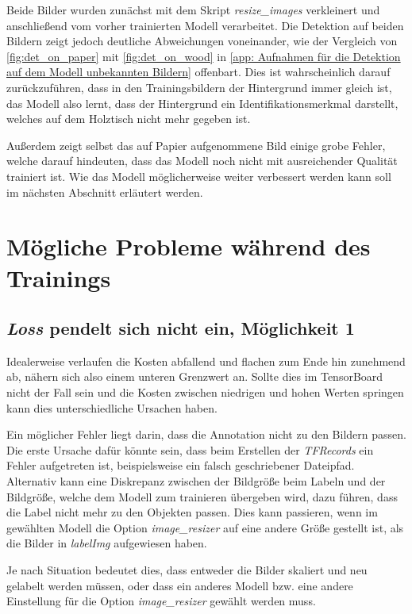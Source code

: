 \documentclass[12pt, oneside]{article}
\begin{document}
Beide Bilder wurden zunächst mit dem Skript \textit{resize\_images} verkleinert und anschließend vom vorher trainierten Modell verarbeitet. Die Detektion auf beiden Bildern zeigt jedoch deutliche Abweichungen voneinander, wie der Vergleich von \autoref{fig:det_on_paper} mit \autoref{fig:det_on_wood} in \autoref{app: Aufnahmen für die Detektion auf dem Modell unbekannten Bildern} offenbart. Dies ist wahrscheinlich darauf zurückzuführen, dass in den Trainingsbildern der Hintergrund immer gleich ist, das Modell also lernt, dass der Hintergrund ein Identifikationsmerkmal darstellt, welches auf dem Holztisch nicht mehr gegeben ist.

Außerdem zeigt selbst das auf Papier aufgenommene Bild einige grobe Fehler, welche darauf hindeuten, dass das Modell noch nicht mit ausreichender Qualität trainiert ist. Wie das Modell möglicherweise weiter verbessert werden kann soll im nächsten Abschnitt erläutert werden.

\section{Mögliche Probleme während des Trainings}

\subsection{\textit{Loss} pendelt sich nicht ein, Möglichkeit 1}

Idealerweise verlaufen die Kosten abfallend und flachen zum Ende hin zunehmend ab, nähern sich also einem unteren Grenzwert an. Sollte dies im TensorBoard nicht der Fall sein und die Kosten zwischen niedrigen und hohen Werten springen kann dies unterschiedliche Ursachen haben.

Ein möglicher Fehler liegt darin, dass die Annotation nicht zu den Bildern passen. Die erste Ursache dafür könnte sein, dass beim Erstellen der \textit{TFRecords} ein Fehler aufgetreten ist, beispielsweise ein falsch geschriebener Dateipfad.\\

Alternativ kann eine Diskrepanz zwischen der Bildgröße beim Labeln und der Bildgröße, welche dem Modell zum trainieren übergeben wird, dazu führen, dass die Label nicht mehr zu den Objekten passen. Dies kann passieren, wenn im gewählten Modell die Option \textit{image\_resizer} auf eine andere Größe gestellt ist, als die Bilder in \textit{labelImg} aufgewiesen haben.

Je nach Situation bedeutet dies, dass entweder die Bilder skaliert und neu gelabelt werden müssen, oder dass ein anderes Modell bzw. eine andere Einstellung für die Option \textit{image\_resizer} gewählt werden muss.
\end{document}
